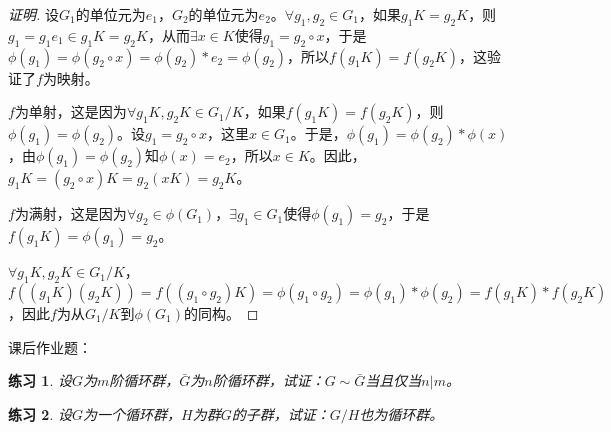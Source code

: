 \documentclass{article}
\newtheorem{Exercise}{练习}
\begin{document}
\begin{CJK*}{UTF8}{gbsn}
\begin{proof}[证明]
设$G_1$的单位元为$e_1$，$G_2$的单位元为$e_2$。$\forall g_1,g_2\in G_1$，如果$g_1K=g_2K$，则$g_1=g_1e_1\in g_1K=g_2K$，从而$\exists x\in K$使得$g_1=g_2\circ x$，于是$\phi(g_1)=\phi(g_2\circ x)=\phi(g_2)*e_2=\phi(g_2)$，所以$f(g_1K)=f(g_2K)$，这验证了$f$为映射。

$f$为单射，这是因为$\forall g_1K,g_2K\in G_1/K$，如果$f(g_1K)=f(g_2K)$，则$\phi(g_1)=\phi(g_2)$。设$g_1=g_2\circ x$，这里$x\in G_1$。于是，$\phi(g_1)=\phi(g_2)*\phi(x)$，由$\phi(g_1)=\phi(g_2)$知$\phi(x)=e_2$，所以$x\in K$。因此，$g_1K=(g_2\circ x)K=g_2(xK)=g_2K$。

$f$为满射，这是因为$\forall g_2 \in \phi(G_1)$，$\exists g_1\in G_1$使得$\phi(g_1)=g_2$，于是$f(g_1K)=\phi(g_1)=g_2$。

$\forall g_1K,g_2K\in G_1/K$，$f((g_1K)(g_2K))=f((g_1\circ g_2)K)=\phi(g_1\circ g_2)=\phi(g_1)*\phi(g_2)=f(g_1K)*f(g_2K)$，因此$f$为从$G_1/K$到$\phi(G_1)$的同构。
\end{proof}
课后作业题：
\begin{Exercise}
设$G$为$m$阶循环群，$\bar{G}$为$n$阶循环群，试证：$G \sim \bar{G}$当且仅当$n | m$。
\end{Exercise}

\begin{Exercise}
设$G$为一个循环群，$H$为群$G$的子群，试证：$G/H$也为循环群。
\end{Exercise}
\end{CJK*}
\end{document}
